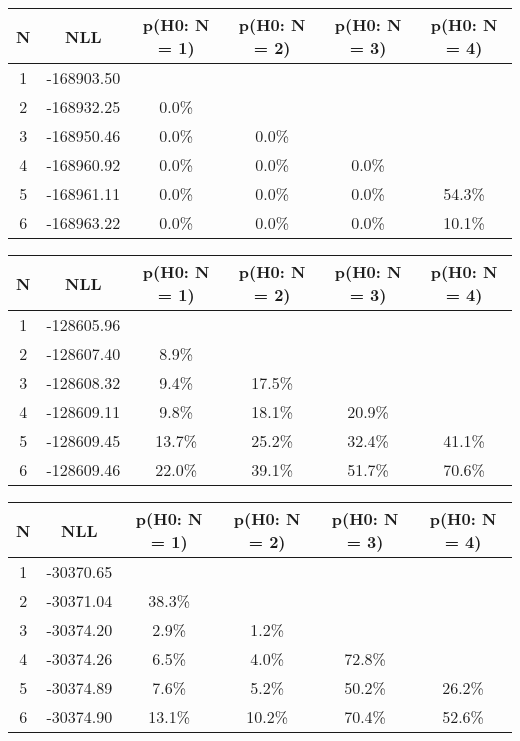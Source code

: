 \begin{table}[htb]
	\begin{center}
{\footnotesize\renewcommand{\arraystretch}{1.4}
		\begin{tabular}{cc||cccc}
			N & NLL & p(H0: N = 1) & p(H0: N = 2) & p(H0: N = 3) & p(H0: N = 4)\\ 
		\hline
1 & -168903.50 & & & & \\
2 & -168932.25 & 0.0\% & & & \\
3 & -168950.46 & 0.0\% & 0.0\% & & \\
4 & -168960.92 & 0.0\% & 0.0\% & 0.0\% & \\
5 & -168961.11 & 0.0\% & 0.0\% & 0.0\% & 54.3\% \\
6 & -168963.22 & 0.0\% & 0.0\% & 0.0\% & 10.1\% \\
	\end{tabular}
		\label{tab:lab}
	}
	\end{center}\end{table}

\begin{table}[htb]
	\begin{center}
{\footnotesize\renewcommand{\arraystretch}{1.4}
		\begin{tabular}{cc||cccc}
			N & NLL & p(H0: N = 1) & p(H0: N = 2) & p(H0: N = 3) & p(H0: N = 4)\\ 
		\hline
1 & -128605.96 & & & & \\
2 & -128607.40 & 8.9\% & & & \\
3 & -128608.32 & 9.4\% & 17.5\% & & \\
4 & -128609.11 & 9.8\% & 18.1\% & 20.9\% & \\
5 & -128609.45 & 13.7\% & 25.2\% & 32.4\% & 41.1\% \\
6 & -128609.46 & 22.0\% & 39.1\% & 51.7\% & 70.6\% \\
	\end{tabular}
		\label{tab:lab}
	}
	\end{center}\end{table}

\begin{table}[htb]
	\begin{center}
{\footnotesize\renewcommand{\arraystretch}{1.4}
		\begin{tabular}{cc||cccc}
			N & NLL & p(H0: N = 1) & p(H0: N = 2) & p(H0: N = 3) & p(H0: N = 4)\\ 
		\hline
1 & -30370.65 & & & & \\
2 & -30371.04 & 38.3\% & & & \\
3 & -30374.20 & 2.9\% & 1.2\% & & \\
4 & -30374.26 & 6.5\% & 4.0\% & 72.8\% & \\
5 & -30374.89 & 7.6\% & 5.2\% & 50.2\% & 26.2\% \\
6 & -30374.90 & 13.1\% & 10.2\% & 70.4\% & 52.6\% \\
	\end{tabular}
		\label{tab:lab}
	}
	\end{center}\end{table}

